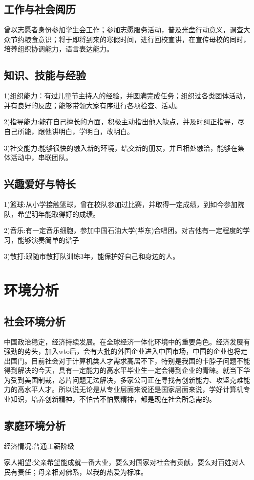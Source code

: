 \documentclass{article}
\begin{document}
\subsection{工作与社会阅历}
曾以志愿者身份参加学生会工作；参加志愿服务活动，普及光盘行动意义，调查大众节约粮食意识；将于即将到来的寒假时间，进行回校宣讲，在宣传母校的同时，培养组织协调能力，语言表达能力。
\par
\subsection{知识、技能与经验}
1)组织能力：有过儿童节主持人的经验，并圆满完成任务；组织过各类团体活动，并有良好的反应；能够带领大家有序进行各项检查、活动。\par
2)指导能力:能在自己擅长的方面，积极主动指出他人缺点，并及时纠正指导，尽自己所能，跟他讲明白，学明白，改明白。\par
3)社交能力:能够很快的融入新的环境，结交新的朋友，并且相处融洽，能够在集体活动中，串联团队。
\par
\subsection{兴趣爱好与特长}
1)篮球:从小学接触篮球，曾在校队参加过比赛，并取得一定成绩，到如今参加院队，希望明年能取得好的成绩。\par
2)音乐:有一定音乐细胞，参加中国石油大学(华东)合唱团。对吉他有一定程度的学习，能够演奏简单的谱子\par
3)散打:跟随市散打队训练3年，能保护好自己和身边的人。
\par
\section{环境分析}
\subsection{社会环境分析}
中国政治稳定，经济持续发展。在全球经济一体化环境中的重要角色。经济发展有强劲的势头，加入wto后，会有大批的外国企业进入中国市场，中国的企业也将走出国门。目前社会对于计算机类人才需求高居不下，特别是我国的卡脖子问题不能得到解决的今天，具有一定能力的高水平毕业生一定会得到企业的青睐。就当下华为受到美国制裁，芯片问题无法解决，多家公司正在寻找有创新能力、攻坚克难能力的高水平人才。所以说无论是从专业层面来说还是国家层面来说，学好计算机专业知识，培养创新精神，不怕苦不怕累精神，都是现在社会所急需的。
\par
\subsection{家庭环境分析}
经济情况:普通工薪阶级\par
家人期望:父亲希望能成就一番大业，要么对国家对社会有贡献，要么对百姓对人民有责任；母亲相对佛系，以我的热爱为标准。\par
\end{document}
